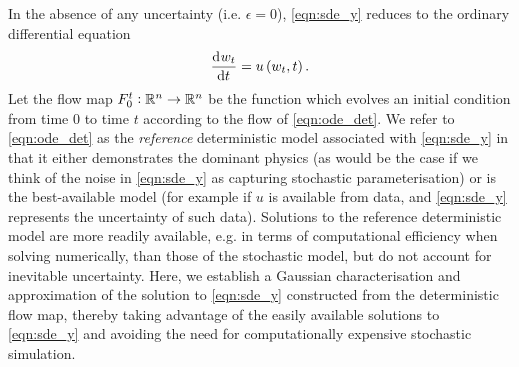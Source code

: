 In the absence of any uncertainty (i.e. \(\epsilon = 0\)), \eqref{eqn:sde_y} reduces to the ordinary differential equation
\begin{equation}
	\dod{w_t}{t} = u\left(w_t, t\right).
	\label{eqn:ode_det}
\end{equation}
Let the flow map \(F_{0}^{t}: \mathbb{R}^n \to \mathbb{R}^n\) be the function which evolves an initial condition from time \(0\) to time \(t\) according to the flow of \eqref{eqn:ode_det}.
We refer to \eqref{eqn:ode_det} as the \emph{reference} deterministic model associated with \eqref{eqn:sde_y} in that 
it either demonstrates the dominant physics (as would be the case if we think of the noise in \eqref{eqn:sde_y} as
capturing stochastic parameterisation) or is the best-available model (for example if $ u $ is available from data, and \eqref{eqn:sde_y} represents the uncertainty of such data). 
Solutions to the reference deterministic model are more readily available, e.g. in terms of computational efficiency when solving numerically, than those of the stochastic model, but do not account for inevitable uncertainty.
Here, we establish a Gaussian characterisation and approximation of the solution to \eqref{eqn:sde_y} constructed from the deterministic flow map, thereby taking advantage of the easily available solutions to \eqref{eqn:sde_y} and avoiding the need for computationally expensive stochastic simulation.








